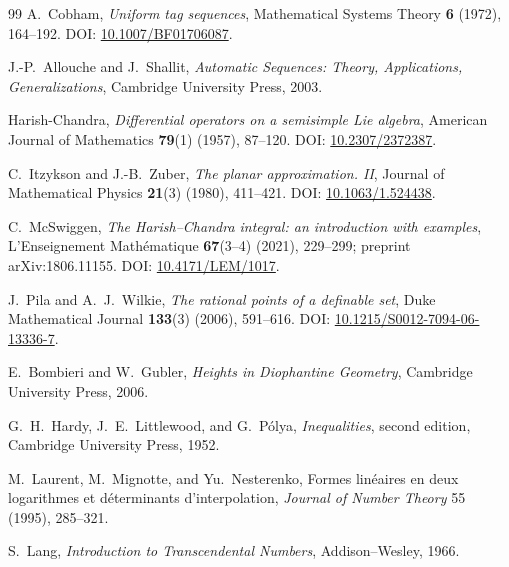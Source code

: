 \documentclass[11pt,oneside]{article}
\theoremstyle{definition}
\theoremstyle{remark}
\begin{document}
\begin{thebibliography}{99}
A.~Cobham,
\newblock \emph{Uniform tag sequences},
\newblock Mathematical Systems Theory \textbf{6} (1972), 164--192.
\newblock DOI: \href{https://doi.org/10.1007/BF01706087}{10.1007/BF01706087}.

J.-P.~Allouche and J.~Shallit,
\newblock \emph{Automatic Sequences: Theory, Applications, Generalizations},
\newblock Cambridge University Press, 2003.

Harish-Chandra,
\newblock \emph{Differential operators on a semisimple Lie algebra},
\newblock American Journal of Mathematics \textbf{79}(1) (1957), 87--120.
\newblock DOI: \href{https://doi.org/10.2307/2372387}{10.2307/2372387}.

C.~Itzykson and J.-B.~Zuber,
\newblock \emph{The planar approximation. II},
\newblock Journal of Mathematical Physics \textbf{21}(3) (1980), 411--421.
\newblock DOI: \href{https://doi.org/10.1063/1.524438}{10.1063/1.524438}.

C.~McSwiggen,
\newblock \emph{The Harish--Chandra integral: an introduction with examples},
\newblock L'Enseignement Math\'ematique \textbf{67}(3--4) (2021), 229--299;
preprint arXiv:1806.11155.
\newblock DOI: \href{https://doi.org/10.4171/LEM/1017}{10.4171/LEM/1017}.

J.~Pila and A.~J.~Wilkie,
\newblock \emph{The rational points of a definable set},
\newblock Duke Mathematical Journal \textbf{133}(3) (2006), 591--616.
\newblock DOI: \href{https://doi.org/10.1215/S0012-7094-06-13336-7}{10.1215/S0012-7094-06-13336-7}.


E.~Bombieri and W.~Gubler,
\newblock \emph{Heights in Diophantine Geometry},
\newblock Cambridge University Press, 2006.

G.~H.~Hardy, J.~E.~Littlewood, and G.~P\'olya,
\newblock \emph{Inequalities}, second edition,
\newblock Cambridge University Press, 1952.

M.~Laurent, M.~Mignotte, and Yu.~Nesterenko,
\newblock Formes lin\'eaires en deux logarithmes et d\'eterminants
 d'interpolation,
\newblock \emph{Journal of Number Theory} 55 (1995), 285--321.

S.~Lang,
\newblock \emph{Introduction to Transcendental Numbers},
\newblock Addison--Wesley, 1966.



\end{thebibliography}
\end{document}
